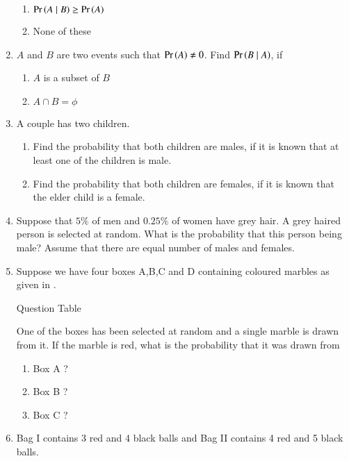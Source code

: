 \begin{enumerate}[label=\thesubsection.\arabic*,ref=\thesubsection.\theenumi]
\begin{enumerate}
\item $\Pr\left(A \mid B\right) \geq \Pr\left(A\right)$  
\item None of these
\end{enumerate}
\solution

\item $A$ and $B$ are two events such that $\Pr\left(A\right) \neq 0$. Find $\Pr\left(B \mid A\right)$, if
\begin{enumerate}
\item $A$ is a subset of $B$
\item $A \cap B = \phi$
\end{enumerate}
\solution 
	
\item A couple has two children.
\begin{enumerate}
\item Find the probability that both children are males, if it is known that at least one of the children is male.
\item Find the probability that both children are females, if it is known that the elder child is a female.
\end{enumerate}
	\item Suppose that $5\%$ of men and $0.25\%$ of women have grey hair. A grey haired person is selected at random. What is the probability that this person being male? Assume that there are equal number of males and females.
\\
\solution
		
\item Suppose we have four boxes A,B,C and D containing coloured marbles as given in . 
\begin{table}[H]
\centering

\caption{Question Table}
\label{tab:12/13/6/12/table1}
\end{table}
One of the boxes has been selected at random and a single marble is drawn from it. If the marble is red,
what is the probability that it was drawn from 
\begin{multicols}{3}
\begin{enumerate}
\item Box A ?\item Box B ?\item Box C ?
\end{enumerate}
\end{multicols}
\solution 
	
\item Bag I contains 3 red and 4 black balls and Bag II contains 4 red and 5 black balls.

\end{enumerate}
